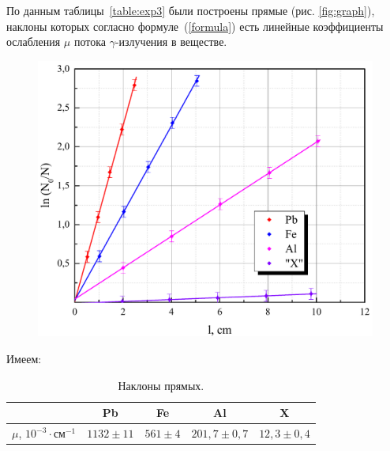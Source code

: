 \documentclass[a4paper,12pt]{article} %
\begin{document}
		По данным таблицы~\ref{table:exp3} были построены прямые (рис. \ref{fig:graph}), наклоны которых согласно формуле~(\ref{formula}) есть линейные коэффициенты ослабления $\mu$ потока $\gamma$-излучения в веществе.
	
		\begin{figure}[h!]
			\begin{floatrow}
				{\includegraphics[scale=0.5]{graph1.pdf}}     
			\end{floatrow}
		\end{figure}
		
		Имеем:
		\begin{table}[H]
			\caption{Наклоны прямых.}
			\label{table:final}
			\begin{tabular}{|c|c|c|c|c|}
				\hline
				& Pb          & Fe         & Al             & X              \\ \hline
				$\mu$, $10^{-3}\cdot \text{см}^{-1}$ & $1132\pm11$ & $561\pm 4$ & $201,7\pm 0,7$ & $12,3 \pm 0,4$ \\ \hline
			\end{tabular}
		\end{table}
	
\newpage
\end{document}

